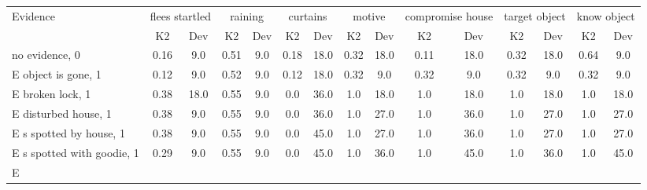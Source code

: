 \begin{table}\begin{tabular}{l|cc|cc|cc|cc|cc|cc|cc}\toprule\multirow{2}{*}{Evidence} & \multicolumn{2}{c}{flees startled}& \multicolumn{2}{c}{raining}& \multicolumn{2}{c}{curtains}& \multicolumn{2}{c}{motive}& \multicolumn{2}{c}{compromise house}& \multicolumn{2}{c}{target object}& \multicolumn{2}{c}{know object}\\& {K2} & {Dev}& {K2} & {Dev}& {K2} & {Dev}& {K2} & {Dev}& {K2} & {Dev}& {K2} & {Dev}& {K2} & {Dev}\\\midrule
no evidence, 0 & \cellcolor{Bittersweet}0.16&\cellcolor{Bittersweet}9.0&\cellcolor{Bittersweet}0.51&\cellcolor{Bittersweet}9.0&\cellcolor{Bittersweet}0.18&\cellcolor{Bittersweet}18.0&\cellcolor{Bittersweet}0.32&\cellcolor{Bittersweet}18.0&\cellcolor{Bittersweet}0.11&\cellcolor{Bittersweet}18.0&\cellcolor{Bittersweet}0.32&\cellcolor{Bittersweet}18.0&\cellcolor{Bittersweet}0.64&\cellcolor{Bittersweet}9.0\\E object is gone, 1 & \cellcolor{Bittersweet}0.12&\cellcolor{Bittersweet}9.0&\cellcolor{Bittersweet}0.52&\cellcolor{Bittersweet}9.0&\cellcolor{Bittersweet}0.12&\cellcolor{Bittersweet}18.0&\cellcolor{Bittersweet}0.32&\cellcolor{Bittersweet}9.0&\cellcolor{Bittersweet}0.32&\cellcolor{Bittersweet}9.0&\cellcolor{Bittersweet}0.32&\cellcolor{Bittersweet}9.0&\cellcolor{Bittersweet}0.32&\cellcolor{Bittersweet}9.0\\E broken lock, 1 & \cellcolor{Bittersweet}0.38&\cellcolor{Bittersweet}18.0&\cellcolor{Bittersweet}0.55&\cellcolor{Bittersweet}9.0&\cellcolor{Bittersweet}0.0&\cellcolor{Bittersweet}36.0&\cellcolor{Bittersweet}1.0&\cellcolor{Bittersweet}18.0&\cellcolor{Bittersweet}1.0&\cellcolor{Bittersweet}18.0&\cellcolor{Bittersweet}1.0&\cellcolor{Bittersweet}18.0&\cellcolor{Bittersweet}1.0&\cellcolor{Bittersweet}18.0\\E disturbed house, 1 & \cellcolor{Bittersweet}0.38&\cellcolor{Bittersweet}9.0&\cellcolor{Bittersweet}0.55&\cellcolor{Bittersweet}9.0&\cellcolor{Bittersweet}0.0&\cellcolor{Bittersweet}36.0&\cellcolor{Bittersweet}1.0&\cellcolor{Bittersweet}27.0&\cellcolor{Bittersweet}1.0&\cellcolor{Bittersweet}36.0&\cellcolor{Bittersweet}1.0&\cellcolor{Bittersweet}27.0&\cellcolor{Bittersweet}1.0&\cellcolor{Bittersweet}27.0\\E s spotted by house, 1 & \cellcolor{Bittersweet}0.38&\cellcolor{Bittersweet}9.0&\cellcolor{Bittersweet}0.55&\cellcolor{Bittersweet}9.0&\cellcolor{Bittersweet}0.0&\cellcolor{Bittersweet}45.0&\cellcolor{Bittersweet}1.0&\cellcolor{Bittersweet}27.0&\cellcolor{Bittersweet}1.0&\cellcolor{Bittersweet}36.0&\cellcolor{Bittersweet}1.0&\cellcolor{Bittersweet}27.0&\cellcolor{Bittersweet}1.0&\cellcolor{Bittersweet}27.0\\E s spotted with goodie, 1 & \cellcolor{Bittersweet}0.29&\cellcolor{Bittersweet}9.0&\cellcolor{Bittersweet}0.55&\cellcolor{Bittersweet}9.0&\cellcolor{Bittersweet}0.0&\cellcolor{Bittersweet}45.0&\cellcolor{Bittersweet}1.0&\cellcolor{Bittersweet}36.0&\cellcolor{Bittersweet}1.0&\cellcolor{Bittersweet}45.0&\cellcolor{Bittersweet}1.0&\cellcolor{Bittersweet}36.0&\cellcolor{Bittersweet}1.0&\cellcolor{Bittersweet}45.0\\E 
\end{tabular}
\end{table}
